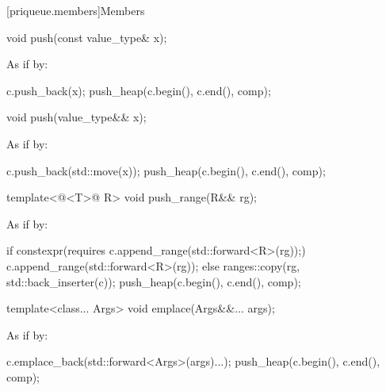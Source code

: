 \documentclass{wg21}
\begin{document}
[priqueue.members]{Members}

%
\begin{itemdecl}
    void push(const value_type& x);
\end{itemdecl}

\begin{itemdescr}
    \pnum
    \effects
    As if by:
    \begin{codeblock}
        c.push_back(x);
        push_heap(c.begin(), c.end(), comp);
    \end{codeblock}
\end{itemdescr}

%
\begin{itemdecl}
    void push(value_type&& x);
\end{itemdecl}

\begin{itemdescr}
    \pnum
    \effects
    As if by:
    \begin{codeblock}
        c.push_back(std::move(x));
        push_heap(c.begin(), c.end(), comp);
    \end{codeblock}
\end{itemdescr}

\begin{addedblock}
%
\begin{itemdecl}
template<@<T>@ R>
void push_range(R&& rg);
\end{itemdecl}
\begin{itemdescr}
    \pnum
    \effects
    As if by:
    \begin{codeblock}
        if constexpr(requires {c.append_range(std::forward<R>(rg));})
        {
             c.append_range(std::forward<R>(rg));
        }
        else {
            ranges::copy(rg, std::back_inserter(c));
        }
        push_heap(c.begin(), c.end(), comp);
    \end{codeblock}
\end{itemdescr}
\end{addedblock}


%
\begin{itemdecl}
    template<class... Args> void emplace(Args&&... args);
\end{itemdecl}

\begin{itemdescr}
    \pnum
    \effects
    As if by:
    \begin{codeblock}
        c.emplace_back(std::forward<Args>(args)...);
        push_heap(c.begin(), c.end(), comp);
    \end{codeblock}
\end{itemdescr}
\end{document}
